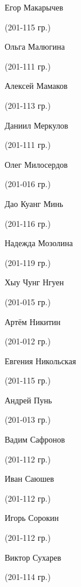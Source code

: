 \begin{multicols}{2}
\begin{small}
\begin{enumerate*}
	\item Егор Макарычев\begin{tiny} (201-115 гр.)\end{tiny}
	\item Ольга Малюгина\begin{tiny} (201-111 гр.)\end{tiny}
	\item Алексей Мамаков\begin{tiny} (201-113 гр.)\end{tiny}
	\item Даниил Меркулов\begin{tiny} (201-111 гр.)\end{tiny}
	\item Олег Милосердов\begin{tiny} (201-016 гр.)\end{tiny}
	\item Дао Куанг Минь\begin{tiny} (201-116 гр.)\end{tiny}
	\item Надежда Мозолина\begin{tiny} (201-119 гр.)\end{tiny}
	\item Хыу Чунг Нгуен\begin{tiny} (201-015 гр.)\end{tiny}
	\item Артём Никитин\begin{tiny} (201-012 гр.)\end{tiny}
	\item Евгения Никольская\begin{tiny} (201-115 гр.)\end{tiny}
	\item Андрей Пунь\begin{tiny} (201-013 гр.)\end{tiny}
	\item Вадим Сафронов\begin{tiny} (201-112 гр.)\end{tiny}
	\item Иван Саюшев\begin{tiny} (201-112 гр.)\end{tiny}
	\item Игорь Сорокин\begin{tiny} (201-112 гр.)\end{tiny}
	\item Виктор Сухарев\begin{tiny} (201-114 гр.)\end{tiny}

\end{enumerate*}
\end{small}
\end{multicols}
